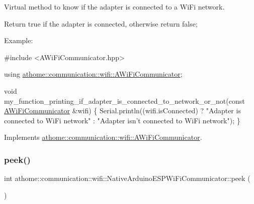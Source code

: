 Virtual method to know if the adapter is connected to a Wi\+Fi network.

Return true if the adapter is connected, otherwise return false;

Example\+:


\begin{DoxyCode}
\textcolor{preprocessor}{#include <AWiFiCommunicator.hpp>}

\textcolor{keyword}{using} \mbox{\hyperlink{classathome_1_1communication_1_1wifi_1_1_a_wi_fi_communicator}{athome::communication::wifi::AWiFiCommunicator}};

\textcolor{keywordtype}{void} my\_function\_printing\_if\_adapter\_is\_connected\_to\_network\_or\_not(\textcolor{keyword}{const} 
      \mbox{\hyperlink{classathome_1_1communication_1_1wifi_1_1_a_wi_fi_communicator_a0098148fe8d0eeee99b7f8f72a72a900}{AWiFiCommunicator}} &wifi) \{
  Serial.println((wifi.isConnected) ? \textcolor{stringliteral}{"Adapter is connected to WiFi network"} : \textcolor{stringliteral}{"Adapter isn't connected to
       WiFi network"});
\}
\end{DoxyCode}
 

Implements \mbox{\hyperlink{classathome_1_1communication_1_1wifi_1_1_a_wi_fi_communicator_a578087d01c814481d89ea702a6d7ed01}{athome\+::communication\+::wifi\+::\+A\+Wi\+Fi\+Communicator}}.

\mbox{\label{classathome_1_1communication_1_1wifi_1_1_native_arduino_e_s_p_wi_fi_communicator_adaa14eb4aa1b147531742c9377aa8db0}} 
\subsubsection{\texorpdfstring{peek()}{peek()}}
{\footnotesize\ttfamily int athome\+::communication\+::wifi\+::\+Native\+Arduino\+E\+S\+P\+Wi\+Fi\+Communicator\+::peek (\begin{DoxyParamCaption}{ }\end{DoxyParamCaption})\hspace{0.3cm}{\ttfamily [virtual]}}


